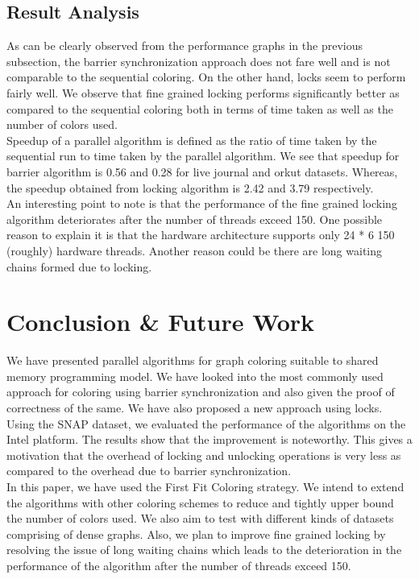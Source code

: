 \documentclass[a4paper,11pt]{article}
\begin{document}
\subsection{Result Analysis}
As can be clearly observed from the performance graphs in the previous subsection, the barrier synchronization approach does not fare well and is not comparable to the sequential coloring. On the other hand, locks seem to perform fairly well. We observe that fine grained locking performs significantly better as compared to the sequential coloring both in terms of time taken as well as the number of colors used.\\
\indent Speedup of a parallel algorithm is defined as the ratio of time taken by the sequential run to time taken by the parallel algorithm. We see that speedup for barrier algorithm is 0.56 and 0.28 for live journal and orkut datasets. Whereas, the speedup obtained from locking algorithm is 2.42 and 3.79 respectively.\\
\indent An interesting point to note is that the performance of the fine grained locking algorithm deteriorates after the number of threads exceed 150. One possible reason to explain it is that the hardware architecture supports only 24 * 6  150 (roughly) hardware threads. Another reason could be there are long waiting chains formed due to locking. 
\vspace{-.2cm}
\section{Conclusion \& Future Work}
We have presented parallel algorithms for graph coloring suitable to shared memory programming model. We have looked into the most commonly used approach for coloring using barrier synchronization and also given the proof of correctness of the same. We have also proposed a new approach using locks. Using the SNAP dataset, we evaluated the performance of the algorithms on the Intel platform. The results show that the improvement is noteworthy. This gives a motivation that the overhead of locking and unlocking operations is very less as compared to the overhead due to barrier synchronization.\\
\indent In this paper, we have used the First Fit Coloring strategy. We intend to extend the algorithms with other coloring schemes to reduce and tightly upper bound the number of colors used. We also aim to test with different kinds of datasets comprising of dense graphs. Also, we plan to improve fine grained locking by resolving the issue of long waiting chains which leads to the deterioration in the performance of the algorithm after the number of threads exceed 150.
\vspace{-.3cm}


\end{document}
